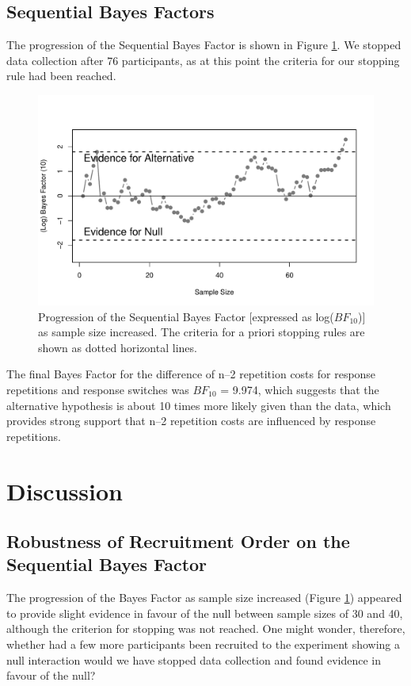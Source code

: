 \documentclass[a4paper, doc, natbib]{apa6}
\begin{document}
\subsection{Sequential Bayes Factors}
The progression of the Sequential Bayes Factor is shown in Figure \ref{fig:bayesFactor}. We stopped data collection after 76 participants, as at this point the criteria for our stopping rule had been reached. 

\begin{figure}
\begin{center}
\includegraphics[width = \textwidth]{Images/bayesFactor.pdf}
\caption{Progression of the Sequential Bayes Factor [expressed as log($BF_{10}$)] as sample size increased. The criteria for a priori stopping rules are shown as dotted horizontal lines.}
\label{fig:bayesFactor}
\end{center}
\end{figure}

The final Bayes Factor for the difference of n--2 repetition costs for response repetitions and response switches was $BF_{10}$ = 9.974, which suggests that the alternative hypothesis is about 10 times more likely given than the data, which provides strong support that n--2 repetition costs are influenced by response repetitions.





\section{Discussion}

\subsection{Robustness of Recruitment Order on the Sequential Bayes Factor}
The progression of the Bayes Factor as sample size increased (Figure \ref{fig:bayesFactor}) appeared to provide slight evidence in favour of the null between sample sizes of 30 and 40, although the criterion for stopping was not reached. One might wonder, therefore, whether had a few more participants been recruited to the experiment showing a null interaction would we have stopped data collection and found evidence in favour of the null?
\end{document}
